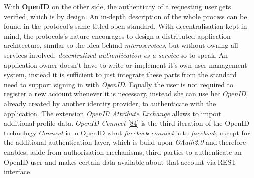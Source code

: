 \documentclass[12pt,english,a4paper,titlepage,cleardoublepage=empty,dottedtoc]{report}
\begin{document}
With \textbf{OpenID} on the other side, the authenticity of a requesting
user gets verified, which is by design. An in-depth description of the
whole process can be found in the protocol's same-titled open standard.
With decentralisation kept in mind, the protocols's nature encourages to
design a distributed application architecture, similar to the idea
behind \emph{microservices}, but without owning all services involved,
\emph{decentralized authentication as a service} so to speak. An
application owner doesn't have to write or implement it's own user
management system, instead it is sufficient to just integrate these
parts from the standard need to support signing in with \emph{OpenID}.
Equally the user is not required to register a new account whenever it
is necessary, instead she can use her \emph{OpenID}, already created by
another identity provider, to authenticate with the application. The
extension \emph{OpenID Attribute Exchange} allows to import additional
profile data. \emph{OpenID Connect}
{[}\protect\hyperlink{ref-web_spec_openid-connect-1}{84}{]} is the third
iteration of the OpenID technology \emph{Connect} is to OpenID what
\emph{facebook connect} is to \emph{facebook}, except for the additional
authentication layer, which is build upon \emph{OAuth2.0} and therefore
enables, aside from authorisation mechanisms, third parties to
authenticate an OpenID-user and makes certain data available about that
account via REST interface.
\end{document}
